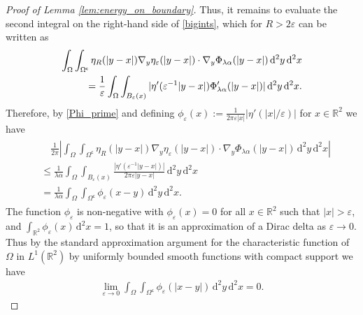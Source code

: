 \documentclass[11pt]{article}
\numberwithin{statement}{section}
\numberwithin{equation}{section}
\theoremstyle{remark}
\newcommand{\R}{\mathbb R} 				%
\newcommand{\intd}{\, \mathrm{d}} 				%
\newcommand{\stcomp}[1]{{#1}^{\mathsf{c}}}		%
\newcommand{\eps}{\varepsilon}
\begin{document}
\begin{proof}[Proof of Lemma \ref{lem:energy_on_boundary}]
    Thus, it remains to evaluate the second integral on the right-hand
    side of \eqref{bigints}, which for $R > 2 \eps$ can be written as
    \begin{align}
    \begin{split}
      \int_\Omega \int_{\stcomp{\Omega}} 
      \eta_R(|y - x|) \nabla_y \eta_\eps(|y - x|) \cdot \nabla_y
      \Phi_{\lambda 
      \alpha}(|y - x|) \intd^2 y \intd^2 x      \\
      = {1 \over \eps} \int_\Omega \int_{B_\eps(x)}  
      |\eta'(\eps^{-1} |y - x|) \Phi'_{\lambda \alpha}(|y - x|)|
      \intd^2 y \intd^2 x .
     \end{split}
    \end{align}
    Therefore, by \eqref{Phi_prime} and defining
    $\phi_\eps(x) := \frac{1}{ 2 \pi \eps |x|} |\eta'(|x|/\eps)|$ for
    $x\in \R^2$ we have
    \begin{align}
     \begin{split}
     & \quad \frac{1}{2 \pi} \left| \int_\Omega \int_{\stcomp{\Omega}} 
      \eta_R(|y - x|) \nabla_y \eta_\eps(|y - x|) \cdot \nabla_y
      \Phi_{\lambda 
      \alpha}(|y - x|) \intd^2 y \intd^2 x \right|      \\
     & \leq  \frac{1}{ \lambda \alpha } \int_\Omega \int_{B_\eps(x)}  \frac{
      |\eta'(\eps^{-1} |y - x|)|}{2
      \pi \eps |y - x|} \intd^2 y \intd^2 x\\
      &  = \frac{1}{ \lambda \alpha}
      \int_\Omega \int_{\stcomp{\Omega}} \phi_\eps(x - y) \intd^2 y
      \intd^2 x.
      \end{split}
    \end{align}
    The function $\phi_\eps$ is non-negative with $\phi_\eps(x) = 0$
    for all $x \in \R^2$ such that $|x| > \eps$, and
    $\int_{\R^2} \phi_\eps(x) \intd^2 x = 1$, so that it is an
    approximation of a Dirac delta as $\eps \to 0$. Thus by the
    standard approximation argument for the characteristic function of
    $\Omega$ in $L^1(\R^2)$ by uniformly bounded smooth functions with
    compact support we have
    \begin{align}\label{eq:vanishes}
      \lim_{\eps \to 0} \int_\Omega \int_{\stcomp{\Omega}}
      \phi_\eps(|x - y|) \intd^2 y \intd^2 x = 0.
    \end{align}
    

\end{proof}
\end{document}

